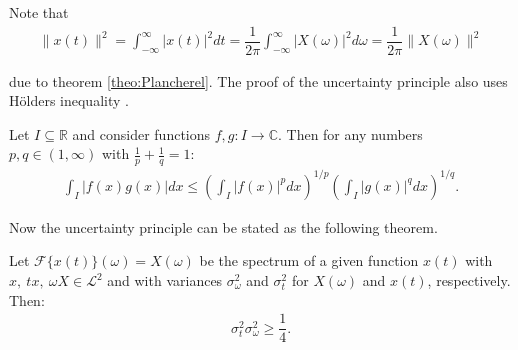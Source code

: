 Note that
\begin{align*}
\|x(t)\|^2 = \int_{-\infty}^\infty |x(t)|^2 dt = \dfrac{1}{2\pi} \int_{-\infty}^\infty |X(\omega)|^2 d\omega = \dfrac{1}{2\pi} \|X(\omega)\|^2
\end{align*}

due to theorem \ref{theo:Plancherel}. The proof of the uncertainty principle also uses Hölders inequality \cite{page 19, FSE2010}.
\begin{theorem} \label{theo:Hölder}
Let $I \subseteq \mathbb{R}$ and consider functions $f,g: I \to \mathbb{C}$. Then for any numbers $p,q \in (1,\infty)$ with $\frac{1}{p} + \frac{1}{q} = 1$:
\begin{align*}
\int_I |f(x) g(x)| dx \leq \left( \int_I |f(x)|^p dx \right)^{1/p} \left( \int_I |g(x)|^q dx \right)^{1/q}.
\end{align*}
\end{theorem}

Now the uncertainty principle can be stated as the following theorem.

\begin{theorem}
Let $\mathcal{F}\{x(t)\}(\omega) = X(\omega)$ be the spectrum of a given function $x(t)$ with $x, \ tx, \ \omega X \in \mathcal{L}^2$ and with variances $\sigma_\omega^2$ and $\sigma_t^2$ for $X(\omega)$ and $x(t)$, respectively. Then:
\begin{align*}
\sigma_t^2 \sigma_\omega^2 \geq \dfrac{1}{4}.
\end{align*}
\end{theorem}

